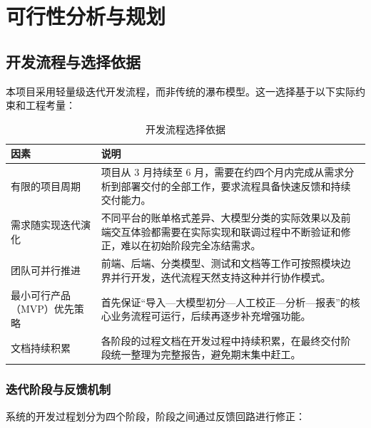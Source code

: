 \chapter{可行性分析与规划}

\section{开发流程与选择依据}

本项目采用轻量级迭代开发流程，而非传统的瀑布模型。这一选择基于以下实际约束和工程考量：

\begin{table}[H]
\centering
\caption{开发流程选择依据}
\label{tab:process-reasons}
\begin{tabular}{p{3cm}p{10.2cm}}
\toprule
\textbf{因素} & \textbf{说明} \\
\midrule
有限的项目周期 & 项目从 3 月持续至 6 月，需要在约四个月内完成从需求分析到部署交付的全部工作，要求流程具备快速反馈和持续交付能力。 \\
\addlinespace
需求随实现迭代演化 & 不同平台的账单格式差异、大模型分类的实际效果以及前端交互体验都需要在实际实现和联调过程中不断验证和修正，难以在初始阶段完全冻结需求。 \\
\addlinespace
团队可并行推进 & 前端、后端、分类模型、测试和文档等工作可按照模块边界并行开发，迭代流程天然支持这种并行协作模式。 \\
\addlinespace
最小可行产品（MVP）优先策略 & 首先保证“导入—大模型初分—人工校正—分析—报表”的核心业务流程可运行，后续再逐步补充增强功能。 \\
\addlinespace
文档持续积累 & 各阶段的过程文档在开发过程中持续积累，在最终交付阶段统一整理为完整报告，避免期末集中赶工。 \\
\bottomrule
\end{tabular}
\end{table}

\subsection{迭代阶段与反馈机制}

系统的开发过程划分为四个阶段，阶段之间通过反馈回路进行修正：

